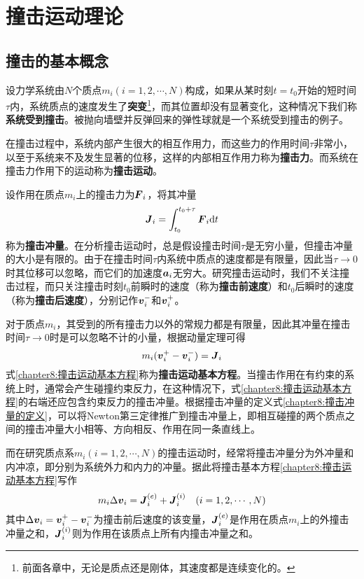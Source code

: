 \chapter{撞击运动理论}

\section{撞击的基本概念}

设力学系统由$N$个质点$m_i(i=1,2,\cdots,N)$构成，如果从某时刻$t=t_0$开始的短时间$\tau$内，系统质点的速度发生了{\bf 突变}\footnote{前面各章中，无论是质点还是刚体，其速度都是连续变化的。}，而其位置却没有显著变化，这种情况下我们称{\bf 系统受到撞击}。被抛向墙壁并反弹回来的弹性球就是一个系统受到撞击的例子。

在撞击过程中，系统内部产生很大的相互作用力，而这些力的作用时间$\tau$非常小，以至于系统来不及发生显著的位移，这样的内部相互作用力称为{\bf 撞击力}。而系统在撞击力作用下的运动称为{\bf 撞击运动}。

设作用在质点$m_i$上的撞击力为$\boldsymbol{F}_i$，将其冲量
\begin{equation}
	\boldsymbol{J}_i = \int_{t_0}^{t_0+\tau}\boldsymbol{F}_i\mathrm{d} t
	\label{chapter8:撞击冲量的定义}
\end{equation}
称为{\bf 撞击冲量}。在分析撞击运动时，总是假设撞击时间$\tau$是无穷小量，但撞击冲量的大小是有限的。由于在撞击时间$\tau$内系统中质点的速度都是有限量，因此当$\tau\to0$时其位移可以忽略，而它们的加速度$\boldsymbol{a}_i$无穷大。研究撞击运动时，我们不关注撞击过程，而只关注撞击时刻$t_0$前瞬时的速度（称为{\bf 撞击前速度}）和$t_0$后瞬时的速度（称为{\bf 撞击后速度}），分别记作$\boldsymbol{v}_i^-$和$\boldsymbol{v}_i^+$。

对于质点$m_i$，其受到的所有撞击力以外的常规力都是有限量，因此其冲量在撞击时间$\tau\to 0$时是可以忽略不计的小量，根据动量定理可得
\begin{equation}
	m_i(\boldsymbol{v}_i^+-\boldsymbol{v}_i^-) = \boldsymbol{J}_i
	\label{chapter8:撞击运动基本方程}
\end{equation}
式\eqref{chapter8:撞击运动基本方程}称为{\bf 撞击运动基本方程}。当撞击作用在有约束的系统上时，通常会产生碰撞约束反力，在这种情况下，式\eqref{chapter8:撞击运动基本方程}的右端还应包含约束反力的撞击冲量。根据撞击冲量的定义式\eqref{chapter8:撞击冲量的定义}，可以将Newton第三定律推广到撞击冲量上，即相互碰撞的两个质点之间的撞击冲量大小相等、方向相反、作用在同一条直线上。

而在研究质点系$m_i(i=1,2,\cdots,N)$的撞击运动时，经常将撞击冲量分为外冲量和内冲凉，即分别为系统外力和内力的冲量。据此将撞击基本方程\eqref{chapter8:撞击运动基本方程}写作
\begin{equation}
	m_i\Delta \boldsymbol{v}_i = \boldsymbol{J}_i^{(e)}+\boldsymbol{J}_i^{(i)}\quad (i=1,2,\cdots,N)
	\label{chapter8:撞击运动基本方程2}
\end{equation}
其中$\Delta \boldsymbol{v}_i = \boldsymbol{v}_i^+-\boldsymbol{v}_i^-$为撞击前后速度的该变量，$\boldsymbol{J}_i^{(e)}$是作用在质点$m_i$上的外撞击冲量之和，$\boldsymbol{J}_i^{(i)}$则为作用在该质点上所有内撞击冲量之和。

